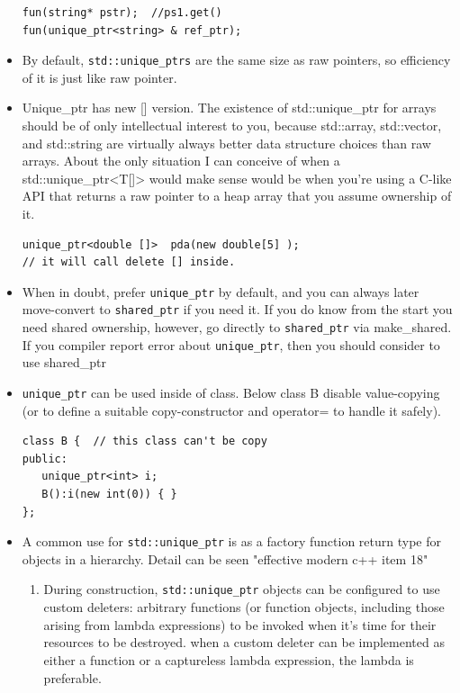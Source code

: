 \documentclass[a4paper,11pt,twoside]{book}
\begin{document}
\begin{itemize}
\begin{lstlisting}[numbers=none]
fun(string* pstr);  //ps1.get()
fun(unique_ptr<string> & ref_ptr);
\end{lstlisting}

\item By default, \texttt{std::unique\_ptrs} are the same size as raw pointers, so efficiency of it is just like raw pointer.

\item Unique\_ptr has new [] version. The existence of std::unique\_ptr for arrays should be of only intellectual interest to you, because std::array, std::vector, and std::string are virtually always better data structure choices than raw arrays. About the only situation I can conceive of when a std::unique\_ptr<T[]> would make sense would be when you're using a C-like API that returns a raw pointer to a heap array that you assume ownership of it.
\begin{lstlisting}[numbers=none]
unique_ptr<double []>  pda(new double[5] );
// it will call delete [] inside.
\end{lstlisting}

\item When in doubt, prefer \texttt{unique\_ptr} by default, and you can always later move-convert to \texttt{shared\_ptr} if you need it. If you do know from the start you need shared ownership, however, go directly to \texttt{shared\_ptr} via make\_shared. If you compiler report error about \texttt{unique\_ptr}, then you should consider to use shared\_ptr

\item \texttt{unique\_ptr} can be used inside of class. Below class B disable value-copying (or to define a suitable copy-constructor  and operator= to handle it safely).
\begin{lstlisting}[numbers=none]
class B {  // this class can't be copy
public:
   unique_ptr<int> i;
   B():i(new int(0)) { }
};
\end{lstlisting}

\item A common use for \texttt{std::unique\_ptr} is as a factory function return type for objects
in a hierarchy. Detail can be seen "effective modern c++ item 18"

\begin{enumerate}
\item During construction, \texttt{std::unique\_ptr} objects can be configured to use custom deleters: arbitrary functions (or function objects, including those arising from lambda expressions) to be invoked when it's time for their resources to be destroyed. when a custom deleter can be implemented as either a function or a captureless lambda expression, the lambda is preferable.


\end{enumerate}
\end{itemize}
\end{document}
